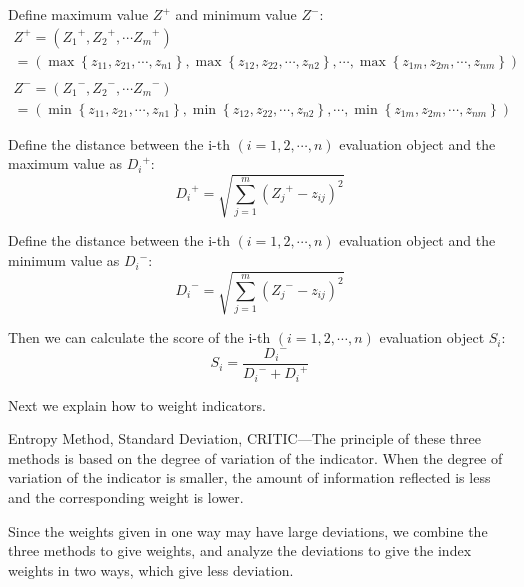 \documentclass[12pt]{article}  %
\begin{document}
\begin{enumerate}[\bfseries 1.]
	Define maximum value ${Z^ + }$ and minimum value ${Z^ -}$:
	\begin{equation}
	\begin{array}{l}
	{Z^ + } = \left( {{Z_1}^ + ,{Z_2}^ + , \cdots {Z_m}^ + } \right)\\
	= \left( {\max \left\{ {{z_{11}},{z_{21}}, \cdots ,{z_{n1}}} \right\},\max \left\{ {{z_{12}},{z_{22}}, \cdots ,{z_{n2}}} \right\}, \cdots ,\max \left\{ {{z_{1m}},{z_{2m}}, \cdots ,{z_{nm}}} \right\}} \right)\\
	\\
	{Z^ - } = \left( {{Z_1}^ - ,{Z_2}^ - , \cdots {Z_m}^ - } \right)\\
	= \left( {\min \left\{ {{z_{11}},{z_{21}}, \cdots ,{z_{n1}}} \right\},\min \left\{ {{z_{12}},{z_{22}}, \cdots ,{z_{n2}}} \right\}, \cdots ,\min \left\{ {{z_{1m}},{z_{2m}}, \cdots ,{z_{nm}}} \right\}} \right)
	\end{array}
	\end{equation}
	
	Define the distance between the i-th $\left( {i = 1,2, \cdots ,n} \right)$ evaluation object and the maximum value as ${D_i}^ + $:
	\begin{equation}
	{D_i}^ +  = \sqrt {\sum\limits_{j = 1}^m {{{\left( {{Z_j}^ +  - {z_{ij}}} \right)}^2}} }
	\end{equation}
	
	Define the distance between the i-th $\left( {i = 1,2, \cdots ,n} \right)$ evaluation object and the minimum value as ${D_i}^ - $:
	\begin{equation}
	{D_i}^ -  = \sqrt {\sum\limits_{j = 1}^m {{{\left( {{Z_j}^ -  - {z_{ij}}} \right)}^2}} }
	\end{equation}
	
	Then we can calculate the score of the i-th $\left( {i = 1,2, \cdots ,n} \right)$ evaluation object ${S_i}$:
	\begin{equation}
	{S_i} = \frac{{{D_i}^ - }}{{{D_i}^ -  + {D_i}^ + }}
	\end{equation}
\end{enumerate}

Next we explain how to weight indicators.

Entropy Method, Standard Deviation, CRITIC---The principle of these three methods is based on the degree of variation of the indicator. When the degree of variation of the indicator is smaller, the amount of information reflected is less and the corresponding weight is lower. 

Since the weights given in one way may have large deviations, we combine the three methods to give weights, and analyze the deviations to give the index weights in two ways, which give less deviation.
\end{document}
